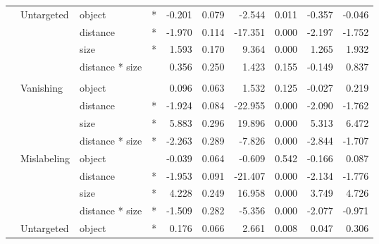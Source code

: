 \begin{longtable}[t]{llllrrrrrr}
\cmidrule{2-10}\nopagebreak
\hspace{1em} & Untargeted & object & * & -0.201 & 0.079 & -2.544 & 0.011 & -0.357 & -0.046\\
\cmidrule{3-10}\nopagebreak
\hspace{1em} &  & distance & * & -1.970 & 0.114 & -17.351 & 0.000 & -2.197 & -1.752\\
\cmidrule{3-10}\nopagebreak
\hspace{1em} &  & size & * & 1.593 & 0.170 & 9.364 & 0.000 & 1.265 & 1.932\\
\cmidrule{3-10}\nopagebreak
\hspace{1em} &  & distance * size &  & 0.356 & 0.250 & 1.423 & 0.155 & -0.149 & 0.837\\
\cmidrule{1-10}\pagebreak[0]
\addlinespace[0.3em]
\multicolumn{10}{l}{\textbf{SSD}}\\
\hspace{1em} & Vanishing & object &  & 0.096 & 0.063 & 1.532 & 0.125 & -0.027 & 0.219\\
\cmidrule{3-10}\nopagebreak
\hspace{1em} &  & distance & * & -1.924 & 0.084 & -22.955 & 0.000 & -2.090 & -1.762\\
\cmidrule{3-10}\nopagebreak
\hspace{1em} &  & size & * & 5.883 & 0.296 & 19.896 & 0.000 & 5.313 & 6.472\\
\cmidrule{3-10}\nopagebreak
\hspace{1em} &  & distance * size & * & -2.263 & 0.289 & -7.826 & 0.000 & -2.844 & -1.707\\
\cmidrule{2-10}\nopagebreak
\hspace{1em} & Mislabeling & object &  & -0.039 & 0.064 & -0.609 & 0.542 & -0.166 & 0.087\\
\cmidrule{3-10}\nopagebreak
\hspace{1em} &  & distance & * & -1.953 & 0.091 & -21.407 & 0.000 & -2.134 & -1.776\\
\cmidrule{3-10}\nopagebreak
\hspace{1em} &  & size & * & 4.228 & 0.249 & 16.958 & 0.000 & 3.749 & 4.726\\
\cmidrule{3-10}\nopagebreak
\hspace{1em} &  & distance * size & * & -1.509 & 0.282 & -5.356 & 0.000 & -2.077 & -0.971\\
\cmidrule{2-10}\nopagebreak
\hspace{1em} & Untargeted & object & * & 0.176 & 0.066 & 2.661 & 0.008 & 0.047 & 0.306\\

\end{longtable}
